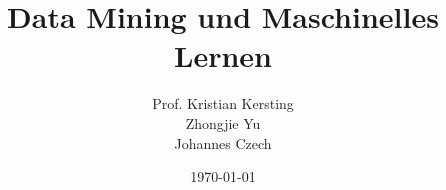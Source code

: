 \documentclass[
	ngerman,
	colorback=false,
	solution=true,
	]{tudaexercise}
\def\homework{7}
\begin{document}
\title[Übungsblatt \homework, Data Mining und Maschinelles Lernen]{Data Mining und Maschinelles Lernen}
\author{Prof. Kristian Kersting\\Zhongjie Yu\\Johannes Czech\\
}
\date{\today}
\sheetnumber{\homework}
\setcounter{section}{\homework}

\maketitle


\newpage

\newpage

\newpage

\newpage

\end{document}
